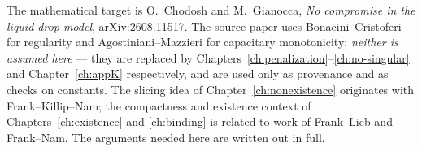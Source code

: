 The mathematical target is O.~Chodosh and M.~Gianocca, \emph{No compromise in
the liquid drop model}, arXiv:2608.11517.  The source paper uses
Bonacini--Cristoferi for regularity and Agostiniani--Mazzieri for capacitary
monotonicity; \emph{neither is assumed here} --- they are replaced by
Chapters~\ref{ch:penalization}--\ref{ch:no-singular} and
Chapter~\ref{ch:appK} respectively, and are used only as provenance and as
checks on constants.  The slicing idea of Chapter~\ref{ch:nonexistence}
originates with Frank--Killip--Nam; the compactness and existence context of
Chapters~\ref{ch:existence} and \ref{ch:binding} is related to work of
Frank--Lieb and Frank--Nam.  The arguments needed here are written out in
full.
